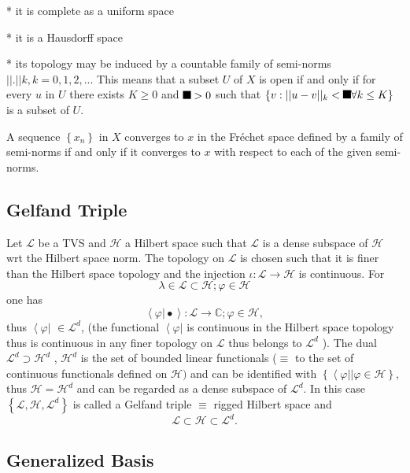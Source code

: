 \documentclass[aps,preprint]{revtex4}%
\providecommand{\U}[1]{\protect\rule{.1in}{.1in}}
\begin{document}
* it is complete as a uniform space

* it is a Hausdorff space

* its topology may be induced by a countable family of semi-norms
$||.||k,k=0,1,2,...$ This means that a subset $U$ of $X$ is open if and only
if for every $u$ in $U$ there exists $K\geq0$ and $\U{3b5} >0$ such that
$\{v:||u-v||_{k}<\U{3b5} \forall k\leq K\}$ is a subset of $U$.

A sequence $\left\{  x_{n}\right\}  $ in $X$ converges to $x$ in the
Fr\'{e}chet space defined by a family of semi-norms if and only if it
converges to $x$ with respect to each of the given semi-norms.

\subsection{Gelfand Triple}

Let $\mathcal{L}$ be a TVS and $\mathcal{H}$ a Hilbert space such that
$\mathcal{L}$ is a dense subspace of $\mathcal{H}$ wrt the Hilbert space norm.
The topology on $\mathcal{L}$ is chosen such that it is finer than the Hilbert
space topology and the injection $\iota:\mathcal{L\rightarrow H}$ is
continuous. For
\begin{equation}
\lambda\in\mathcal{L\subset H};\varphi\in\mathcal{H}%
\end{equation}
one has
\begin{equation}
\left\langle \left.  \varphi\right\vert \bullet\right\rangle
:\mathcal{L\longrightarrow}\mathbb{C};\varphi\in\mathcal{H},
\end{equation}
thus $\left\langle \varphi\right\vert $ $\in\mathcal{L}^{d}$, (the functional
$\left\langle \varphi\right\vert $ is continuous in the Hilbert space topology
thus is continuous in any finer topology on $\mathcal{L}$ thus belongs to
$\mathcal{L}^{d}$ )$.$ The dual $\mathcal{L}^{d}\supset\mathcal{H}^{d}$ ,
$\mathcal{H}^{d}$ is the set of bounded linear functionals ($\equiv$ to the
set of continuous functionals defined on $\mathcal{H)}$ and can be identified
with $\left\{  \left.  \left\langle \varphi\right\vert \right\vert \varphi
\in\mathcal{H}\right\}  ,$ thus $\mathcal{H=H}^{d}$ and can be regarded as a
dense subspace of $\mathcal{L}^{d}$. In this case $\left\{  \mathcal{L}%
,\mathcal{H},\mathcal{L}^{d}\right\}  $ is called a Gelfand triple $\equiv$
rigged Hilbert space and
\[
\mathcal{L}\subset\mathcal{H}\subset\mathcal{L}^{d}.
\]


\subsection{Generalized Basis}
\end{document}
